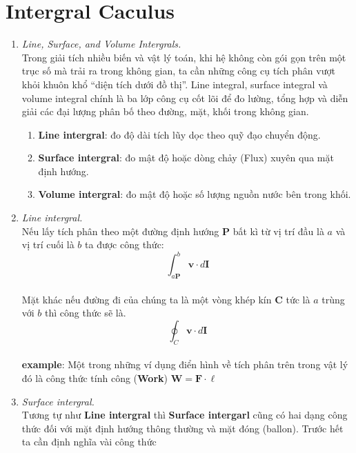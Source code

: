 \section{Intergral Caculus}

\begin{enumerate}
    \item \textit{Line, Surface, and Volume Intergrals.}\\
    Trong giải tích nhiều biến và vật lý toán, khi hệ không còn gói gọn trên một trục số mà trải ra trong không gian, ta cần những công cụ tích phân vượt khỏi khuôn khổ “diện tích dưới đồ thị”.
Line integral, surface integral và volume integral chính là ba lớp công cụ cốt lõi để đo lường, tổng hợp và diễn giải các đại lượng phân bố theo đường, mặt, khối trong không gian.
\\
\begin{enumerate}[label=(\roman*)]
    \item \textbf{Line intergral}: đo độ dài tích lũy dọc theo quỹ đạo chuyển động.\\
    \item \textbf{Surface intergral}: đo mật độ hoặc dòng chảy (Flux) xuyên qua mặt định hướng.\\
    \item \textbf{Volume intergral}: đo mật độ hoặc số lượng nguồn nước bên trong khối.
\end{enumerate}

    \item \textit{Line intergral.}\\
    Nếu lấy tích phân theo một đường định hướng $\mathbf{P}$ bất kì từ vị trí đầu là $a$ và vị trí cuối là $b$ ta được công thức:
\[
    \int_{a\mathbf{P}}^{b} \mathbf{v} \cdot d\mathbf{I}
\]\\
    Mặt khác nếu đường đi của chúng ta là một vòng khép kín $\mathbf{C}$ tức là $a$ trùng với $b$ thì công thức sẽ là.
\[
    \oint_{C} \mathbf{v} \cdot d\mathbf{I}
\]\\
\textbf{example}: Một trong những ví dụng điển hình về tích phân trên trong vật lý đó là công thức tính công (\textbf{Work}) $\mathbf{W} = \mathbf{F} \cdot \ell$
\\
\item \textit{Surface intergral.}\\
Tương tự như \textbf{Line intergral} thì \textbf{Surface intergarl} cũng có hai dạng công thức đối với mặt định hướng thông thường và mặt đóng (ballon).
Trước hết ta cần định nghĩa vài công thức\\


\end{enumerate}
